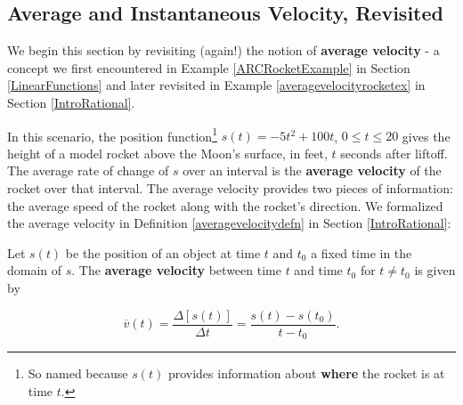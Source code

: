 \documentclass{ximera}
\begin{document}
	\author{Stitz-Zeager}




\setcounter{footnote}{0}

\label{IntroductiontoDerivatives}

\subsection{Average and Instantaneous Velocity, Revisited}
\label{avginstantvelocity}

We begin this section by revisiting (again!) the notion of \textbf{average velocity} - a concept we first encountered in  Example \ref{ARCRocketExample} in Section \ref{LinearFunctions} and later revisited in Example \ref{averagevelocityrocketex} in Section \ref{IntroRational}. 




In this scenario,  the position  function\footnote{So named because $s(t)$   provides information about \textbf{where} the rocket is at time $t$.} $s(t) = -5t^2+100t$, $0 \leq t \leq 20$ gives the height of a model rocket above the Moon's surface, in feet,  $t$ seconds after liftoff.  The average rate of change of $s$ over an interval is the \textbf{average velocity} of the rocket over that interval.  The average velocity provides two pieces of information:  the average speed of the rocket along with the rocket's direction.   We formalized the average velocity in Definition \ref{averagevelocitydefn} in Section \ref{IntroRational}:




\begin{defnrecall} Let $s(t)$ be the position of an object at time $t$ and $t_{0}$  a fixed time in the domain of $s$.  The \textbf{average velocity} between time $t$ and time $t_{0}$  for $t \neq t_{0}$ is given by

\[ \overline{v}(t) =  \frac{\Delta [s(t)]}{\Delta t} =  \frac{s(t) - s(t_{0})}{t - t_{0}}. \]


\end{defnrecall}

\end{document}
